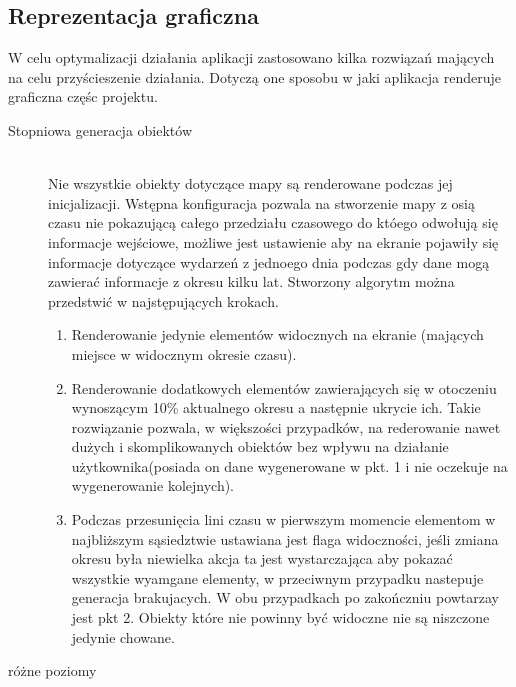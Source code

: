 \subsection{Reprezentacja graficzna}
\label{subsec:showing}

W celu optymalizacji działania aplikacji zastosowano kilka rozwiązań mających na celu przyścieszenie działania. Dotyczą one sposobu w jaki aplikacja renderuje graficzna częśc projektu.


\begin{description}
\item[Stopniowa generacja obiektów]\hfill \\
Nie wszystkie obiekty dotyczące mapy są renderowane podczas jej inicjalizacji. Wstępna konfiguracja pozwala na stworzenie mapy z osią czasu nie pokazującą całego przedziału czasowego do któego odwołują się informacje wejściowe, możliwe jest ustawienie aby na ekranie pojawiły się informacje dotyczące wydarzeń z jednoego dnia podczas gdy dane mogą zawierać informacje z okresu kilku lat. Stworzony algorytm można przedstwić w najstępujących krokach.

\begin{enumerate}
\item
Renderowanie jedynie elementów widocznych na ekranie (mających miejsce w widocznym okresie czasu).

\item
Renderowanie dodatkowych elementów zawierających się w otoczeniu wynoszącym 10\% aktualnego okresu a następnie ukrycie ich. Takie rozwiązanie pozwala, w większości przypadków, na rederowanie nawet dużych i skomplikowanych obiektów bez wpływu na działanie użytkownika(posiada on dane wygenerowane w pkt. 1 i nie oczekuje na wygenerowanie kolejnych).

\item
Podczas przesunięcia lini czasu w pierwszym momencie elementom w najbliższym sąsiedztwie ustawiana jest flaga widoczności, jeśli zmiana okresu była niewielka akcja ta jest wystarczająca aby pokazać wszystkie wyamgane elementy, w przeciwnym przypadku nastepuje generacja brakujacych. W obu przypadkach po zakończniu powtarzay jest pkt 2. Obiekty które nie powinny być widoczne nie są niszczone jedynie chowane.

\end{enumerate}

\item[różne poziomy]\hfill \\

\end{description}